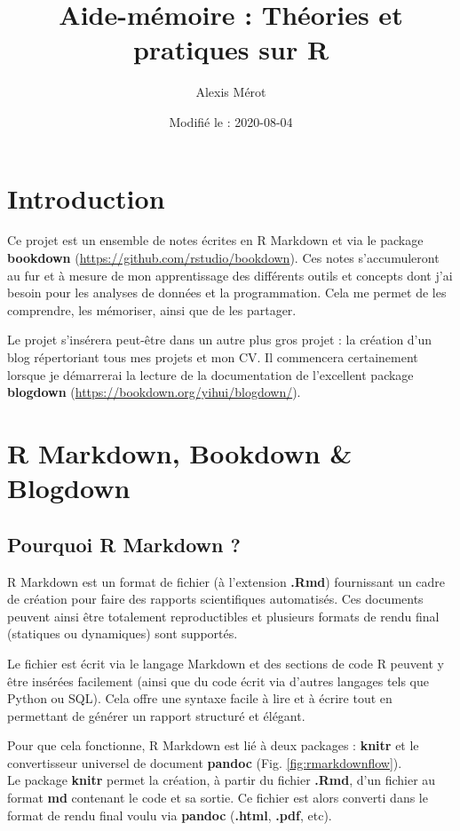\documentclass[
]{book}
\title{Aide-mémoire : Théories et pratiques sur R}
\author{Alexis Mérot}
\date{Modifié le : 2020-08-04}
\begin{document}
\maketitle

{
\setcounter{tocdepth}{1}
\tableofcontents
}
\hypertarget{introduction}{%
\chapter*{Introduction}\label{introduction}}

Ce projet est un ensemble de notes écrites en R Markdown \citep{R-rmarkdown} et via
le package \textbf{bookdown} (\url{https://github.com/rstudio/bookdown}). Ces notes
s'accumuleront au fur et à mesure de mon apprentissage des différents outils et
concepts dont j'ai besoin pour les analyses de données et la programmation. Cela
me permet de les comprendre, les mémoriser, ainsi que de les partager.

Le projet s'insérera peut-être dans un autre plus gros projet : la création d'un
blog répertoriant tous mes projets et mon CV. Il commencera certainement lorsque
je démarrerai la lecture de la documentation de l'excellent package \textbf{blogdown}
(\url{https://bookdown.org/yihui/blogdown/}).

\hypertarget{rmarkdown}{%
\chapter{R Markdown, Bookdown \& Blogdown}\label{rmarkdown}}

\hypertarget{pourquoi-rmarkdown}{%
\section{Pourquoi R Markdown ?}\label{pourquoi-rmarkdown}}

R Markdown est un format de fichier (à l'extension \textbf{.Rmd}) fournissant un cadre
de création pour faire des rapports scientifiques automatisés. Ces documents
peuvent ainsi être totalement reproductibles et plusieurs formats de rendu
final (statiques ou dynamiques) sont supportés.

Le fichier est écrit via le langage Markdown et des sections de code R peuvent y
être insérées facilement (ainsi que du code écrit via d'autres langages tels
que Python ou SQL). Cela offre une syntaxe facile à lire et à écrire tout en
permettant de générer un rapport structuré et élégant.

Pour que cela fonctionne, R Markdown est lié à deux packages : \textbf{knitr} et le
convertisseur universel de document \textbf{pandoc} (Fig. \ref{fig:rmarkdownflow}).\\
Le package \textbf{knitr} permet la création, à partir du fichier \textbf{.Rmd}, d'un fichier
au format \textbf{md} contenant le code et sa sortie. Ce fichier est alors converti
dans le format de rendu final voulu via \textbf{pandoc} (\textbf{.html}, \textbf{.pdf}, etc).
\end{document}
